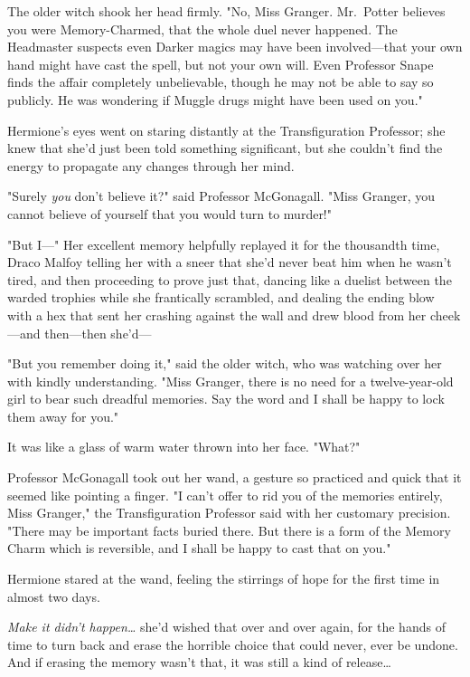 The older witch shook her head firmly. "No, Miss Granger. Mr.~Potter believes
you were Memory-Charmed, that the whole duel never happened. The Headmaster
suspects even Darker magics may have been involved---that your own hand might
have cast the spell, but not your own will. Even Professor Snape finds the
affair completely unbelievable, though he may not be able to say so publicly.
He was wondering if Muggle drugs might have been used on you."

Hermione's eyes went on staring distantly at the Transfiguration Professor; she
knew that she'd just been told something significant, but she couldn't find the
energy to propagate any changes through her mind.

"Surely \emph{you} don't believe it?" said Professor McGonagall. "Miss Granger,
you cannot believe of yourself that you would turn to murder!"

"But I---" Her excellent memory helpfully replayed it for the thousandth time,
Draco Malfoy telling her with a sneer that she'd never beat him when he wasn't
tired, and then proceeding to prove just that, dancing like a duelist between
the warded trophies while she frantically scrambled, and dealing the ending
blow with a hex that sent her crashing against the wall and drew blood from her
cheek---and then---then she'd---

"But you remember doing it," said the older witch, who was watching over her
with kindly understanding. "Miss Granger, there is no need for a
twelve-year-old girl to bear such dreadful memories. Say the word and I shall
be happy to lock them away for you."

It was like a glass of warm water thrown into her face. "What?"

Professor McGonagall took out her wand, a gesture so practiced and quick that
it seemed like pointing a finger. "I can't offer to rid you of the memories
entirely, Miss Granger," the Transfiguration Professor said with her customary
precision. "There may be important facts buried there. But there is a form of
the Memory Charm which is reversible, and I shall be happy to cast that on you."

Hermione stared at the wand, feeling the stirrings of hope for the first time
in almost two days.

\emph{Make it didn't happen{\ldots}} she'd wished that over and over again, for
the hands of time to turn back and erase the horrible choice that could never,
ever be undone. And if erasing the memory wasn't that, it was still a kind of
release{\ldots}

